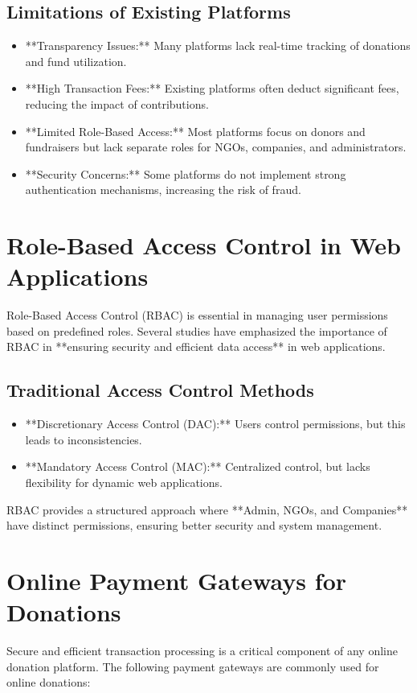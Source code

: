 \subsection{Limitations of Existing Platforms}
\begin{itemize}
    \item **Transparency Issues:** Many platforms lack real-time tracking of donations and fund utilization.
    \item **High Transaction Fees:** Existing platforms often deduct significant fees, reducing the impact of contributions.
    \item **Limited Role-Based Access:** Most platforms focus on donors and fundraisers but lack separate roles for NGOs, companies, and administrators.
    \item **Security Concerns:** Some platforms do not implement strong authentication mechanisms, increasing the risk of fraud.
\end{itemize}

\section{Role-Based Access Control in Web Applications}
Role-Based Access Control (RBAC) is essential in managing user permissions based on predefined roles. Several studies have emphasized the importance of RBAC in **ensuring security and efficient data access** in web applications.

\subsection{Traditional Access Control Methods}
\begin{itemize}
    \item **Discretionary Access Control (DAC):** Users control permissions, but this leads to inconsistencies.
    \item **Mandatory Access Control (MAC):** Centralized control, but lacks flexibility for dynamic web applications.
    \end{itemize}
    
RBAC provides a structured approach where **Admin, NGOs, and Companies** have distinct permissions, ensuring better security and system management.

\section{Online Payment Gateways for Donations}
Secure and efficient transaction processing is a critical component of any online donation platform. The following payment gateways are commonly used for online donations:

